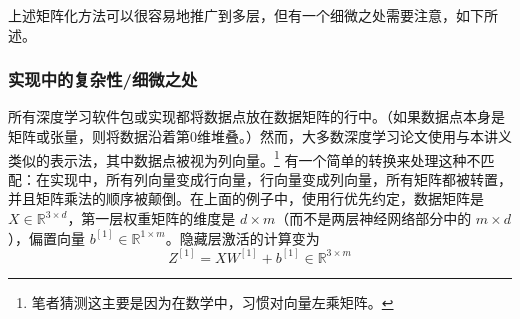 上述矩阵化方法可以很容易地推广到多层，但有一个细微之处需要注意，如下所述。

\subsubsection*{实现中的复杂性/细微之处}

所有深度学习软件包或实现都将数据点放在数据矩阵的行中。（如果数据点本身是矩阵或张量，则将数据沿着第0维堆叠。）然而，大多数深度学习论文使用与本讲义类似的表示法，其中数据点被视为列向量。\footnote{笔者猜测这主要是因为在数学中，习惯对向量左乘矩阵。} 有一个简单的转换来处理这种不匹配：在实现中，所有列向量变成行向量，行向量变成列向量，所有矩阵都被转置，并且矩阵乘法的顺序被颠倒。在上面的例子中，使用行优先约定，数据矩阵是 $X \in \mathbb{R}^{3 \times d}$，第一层权重矩阵的维度是 $d \times m$（而不是两层神经网络部分中的 $m \times d$），偏置向量 $b^{[1]} \in \mathbb{R}^{1 \times m}$。隐藏层激活的计算变为
\begin{equation}
    Z^{[1]} = XW^{[1]} + b^{[1]} \in \mathbb{R}^{3 \times m} \label{eq:7.84}
\end{equation}